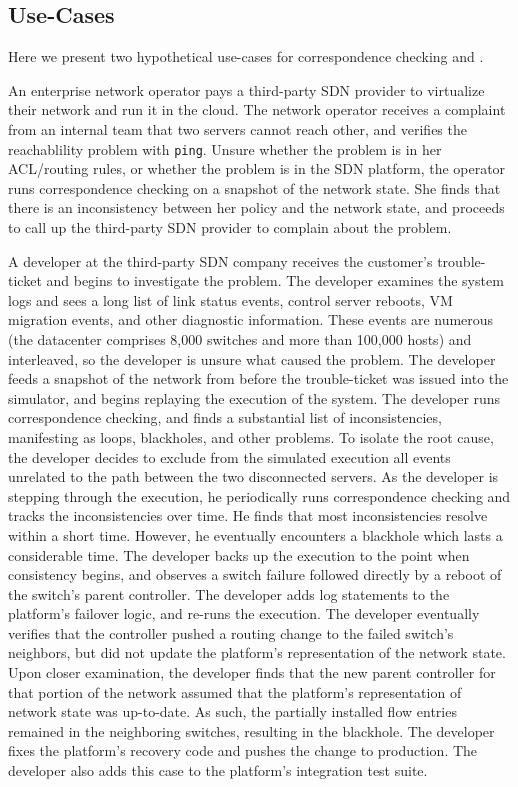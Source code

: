 \subsection{Use-Cases}

Here we present two hypothetical use-cases for correspondence checking and
\simulator.

 An enterprise network
operator pays a third-party SDN provider to virtualize their network
and run it in the cloud. The network operator receives a complaint
from an internal team that two servers cannot reach other, and 
verifies the reachablility problem with {\tt ping}. Unsure
whether the problem is in her ACL/routing rules, 
or whether the problem is in the SDN platform, the
operator runs correspondence checking on a snapshot of the network state. She
finds that there is an inconsistency between her policy and the network state, 
and proceeds to call up the third-party SDN provider to complain
about the problem.

 A developer at the third-party SDN
company receives the customer's trouble-ticket and begins to investigate the
problem. The developer examines the system logs and sees a
long list of link status events, control server reboots, VM migration events,
and other diagnostic information. These events are numerous (the
datacenter comprises 8,000 switches and more than 100,000 hosts) and
interleaved, so the developer is unsure what caused the problem.
The developer feeds a snapshot of the network from before the
trouble-ticket was issued into the simulator, and
begins replaying the execution of the system. The developer runs
correspondence checking, and finds a substantial list of inconsistencies,
manifesting as loops, blackholes, and other problems.
To isolate the root cause, the developer decides to exclude from the simulated
execution all events unrelated to the path between the two disconnected
servers. As the developer is stepping through the execution, he periodically
runs correspondence checking and tracks the inconsistencies over time. He
finds that most inconsistencies resolve within a short time. However, he
eventually encounters a blackhole which lasts a considerable time. The
developer backs up the execution to the point when consistency begins, and
observes a switch failure followed directly by a reboot of the switch's parent
controller. The developer adds log statements to the platform's failover
logic, and re-runs the execution. The developer eventually verifies that the
controller pushed a routing change to the failed switch's neighbors, but did
not update the platform's representation of the network state. Upon closer
examination, the developer finds that the new parent controller for that
portion of the network assumed that the platform's
representation of network state was up-to-date. As such, the partially installed flow entries remained
in the neighboring switches, resulting in the blackhole. The developer fixes
the platform's recovery code and pushes the change to production. The
developer also adds this case to the platform's integration test suite.

